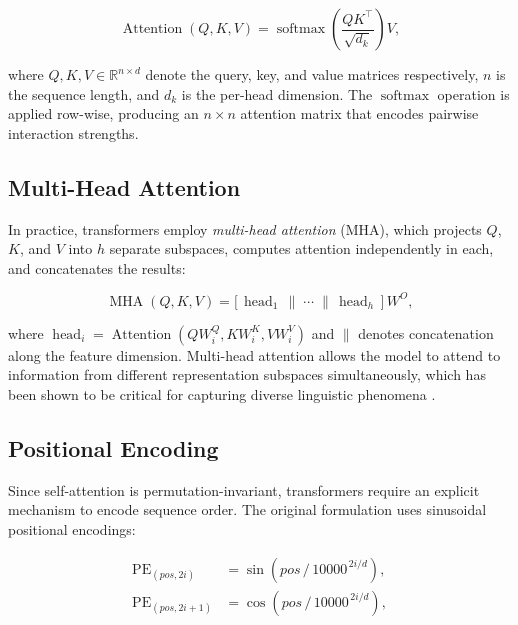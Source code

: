 \documentclass[12pt,a4paper,oneside]{book}
\begin{document}
\begin{equation}
  \operatorname{Attention}(Q,K,V) = \operatorname{softmax}\!\left(
    \frac{QK^{\top}}{\sqrt{d_k}}
  \right) V ,
  \label{eq:attention}
\end{equation}

where $Q, K, V \in \mathbb{R}^{n \times d}$ denote the query, key, and value matrices
respectively, $n$ is the sequence length, and $d_k$ is the per-head dimension. The
$\operatorname{softmax}$ operation is applied row-wise, producing an $n \times n$ attention
matrix that encodes pairwise interaction strengths.

\subsection{Multi-Head Attention}

In practice, transformers employ \textit{multi-head attention} (MHA), which projects
$Q$, $K$, and $V$ into $h$ separate subspaces, computes attention independently in each,
and concatenates the results:

\begin{equation}
  \operatorname{MHA}(Q,K,V) = \bigl[\,\operatorname{head}_1 \,\|\; \cdots \;\|\,
    \operatorname{head}_h\,\bigr]\,W^{O},
  \label{eq:mha}
\end{equation}

where $\operatorname{head}_i = \operatorname{Attention}(QW_i^{Q}, KW_i^{K}, VW_i^{V})$ and
$\|$ denotes concatenation along the feature dimension. Multi-head attention allows the model
to attend to information from different representation subspaces simultaneously, which has
been shown to be critical for capturing diverse linguistic phenomena
\cite{voita2019analyzing}.

\subsection{Positional Encoding}

Since self-attention is permutation-invariant, transformers require an explicit mechanism to
encode sequence order. The original formulation uses sinusoidal positional encodings:

\begin{equation}
  \begin{aligned}
    \operatorname{PE}_{(pos,2i)}   &= \sin\!\left( pos \,/\, 10000^{\,2i/d} \right) ,\\
    \operatorname{PE}_{(pos,2i+1)} &= \cos\!\left( pos \,/\, 10000^{\,2i/d} \right) ,
  \end{aligned}
  \label{eq:positional}
\end{equation}
\end{document}
